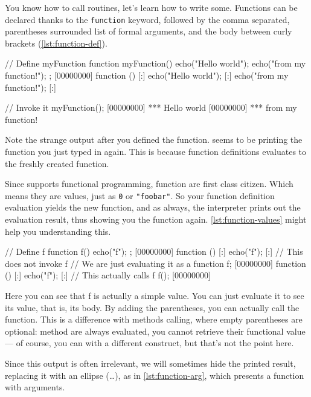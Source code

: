 \documentclass[openright,twoside,12pt]{report}
\begin{document}
You know how to call routines, let's learn how to write
some. Functions can be declared thanks to the \texttt{function}
keyword, followed by the comma separated, parentheses surrounded list
of formal arguments, and the body between curly brackets (\autoref{lst:function-def}).

\begin{urbiscript}[caption=Defining a function,label=lst:function-def]
// Define myFunction
function myFunction()
{
  echo("Hello world");
  echo("from my function!");
};
[00000000] function () {
[:]  echo("Hello world");
[:]  echo("from my function!");
[:]}

// Invoke it
myFunction();
[00000000] *** Hello world
[00000000] *** from my function!
\end{urbiscript}

Note the strange output after you defined the function. \urbi seems to
be printing the function you just typed in again. This is because
function definitions evaluates to the freshly created function.

Since \urbi supports functional programming, function are first class
citizen. Which means they are values, just as \texttt{0} or
\texttt{"foobar"}. So your function definition evaluation yields the
new function, and as always, the interpreter prints out the evaluation
result, thus showing you the function again. \autoref{lst:function-values}
might help you understanding this.


\begin{urbiscript}[caption=Function as values,label=lst:function-values]
// Define f
function f()
{
  echo("f");
};
[00000000] function () {
[:]  echo("f");
[:]}
// This does not invoke f
// We are just evaluating it as a function
f;
[00000000] function () {
[:]  echo("f");
[:]}
// This actually calls f
f();
[00000000]
\end{urbiscript}

Here you can see that f is actually a simple value. You can just
evaluate it to see its value, that is, its body. By adding the
parentheses, you can actually call the function. This is a difference
with methods calling, where empty parentheses are optional: method are
always evaluated, you cannot retrieve their functional value --- of
course, you can with a different construct, but that's not the point
here.

Since this output is often irrelevant, we will sometimes hide the
printed result, replacing it with an ellipse (\ldots), as in
\autoref{lst:function-arg}, which presents a function with arguments.
\end{document}

